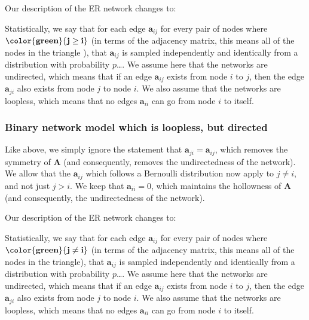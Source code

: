 \documentclass[letterpaper,10pt,english]{jupyterBook}
\begin{document}
\sphinxAtStartPar
Our description of the ER network changes to:

\sphinxAtStartPar
Statistically, we say that for each edge \(\mathbf{a}_{ij}\) for every pair of nodes where \(\mathbf{\color{green}{j \geq i}}\) (in terms of the adjacency matrix, this means all of the nodes in the  triangle ), that \(\mathbf{a}_{ij}\) is sampled independently and identically from a  distribution with probability \(p\)….  We assume here that the networks are undirected, which means that if an edge \(\mathbf a_{ij}\) exists from node \(i\) to \(j\), then the edge \(\mathbf a_{ji}\) also exists from node \(j\) to node \(i\). We also assume that the networks are loopless, which means that no edges \(\mathbf a_{ii}\) can go from node \(i\) to itself.


\subsubsection{Binary network model which is loopless, but directed}
\label{\detokenize{representations/ch5/single-network-models_theory:binary-network-model-which-is-loopless-but-directed}}
\sphinxAtStartPar
Like above, we simply ignore the statement that \(\mathbf a_{ji} = \mathbf a_{ij}\), which removes the symmetry of \(\mathbf A\) (and consequently, removes the undirectedness of the network). We allow that the \(\mathbf a_{ij}\) which follows a Bernoulli distribution now apply to \(j \neq i\), and not just \(j > i\). We keep that \(\mathbf a_{ii} = 0\), which maintains the hollowness of \(\mathbf A\) (and consequently, the undirectedness of the network).

\sphinxAtStartPar
Our description of the ER network changes to:

\sphinxAtStartPar
Statistically, we say that for each edge \(\mathbf{a}_{ij}\) for every pair of nodes where \(\mathbf{\color{green}{j \neq i}}\) (in terms of the adjacency matrix, this means all of the nodes in the  triangle), that \(\mathbf{a}_{ij}\) is sampled independently and identically from a  distribution with probability \(p\)….  We assume here that the networks are undirected, which means that if an edge \(\mathbf a_{ij}\) exists from node \(i\) to \(j\), then the edge \(\mathbf a_{ji}\) also exists from node \(j\) to node \(i\). We also assume that the networks are loopless, which means that no edges \(\mathbf a_{ii}\) can go from node \(i\) to itself.
\end{document}
